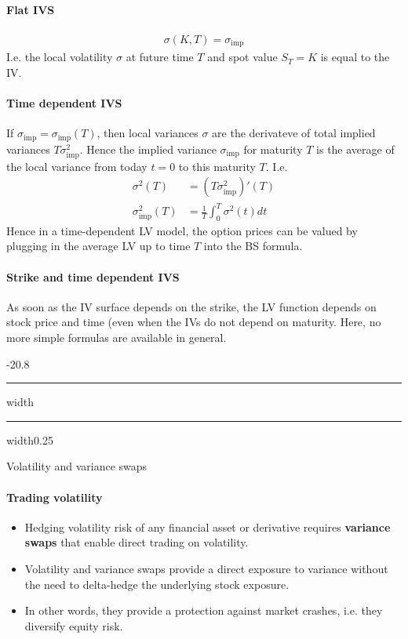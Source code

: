 \documentclass[a4paper,landscape,7pt,fleqn]{scrartcl}
\makeatletter
\renewcommand{\emph}[1]{\textbf{#1}}
\renewcommand{\subsection}{\@startsection{subsection}{1}{0mm}%
{-2\baselineskip}{0.8\baselineskip}%
{\hrule depth 0.2pt width\columnwidth\hrule depth0.75pt
width0.25\columnwidth\vspace*{1.2em}\large\bfseries}}
\makeatother
\begin{document}
\begin{multicols*}{3}
\paragraph{Flat IVS}
\begin{align*}
\sigma(K,T) = \sigma_{\text{imp}}
\end{align*}
I.e. the local volatility $\sigma$ at future time $T$ and spot value $S_T=K$ is equal to the IV.

\paragraph{Time dependent IVS}
If $\sigma_{\text{imp}} = \sigma_{\text{imp}}(T)$, then local variances $\sigma$ are the derivateve of total implied variances $T \sigma_{\text{imp}}^2$. Hence the implied variance $\sigma_{\text{imp}}$ for maturity $T$ is the average of the local variance from today $t=0$ to this maturity $T$. I.e.
\begin{align*}
\sigma^2(T) &= (T \sigma_{\text{imp}}^2)'(T) \\
\sigma_{\text{imp}}^2(T) &= \frac{1}{T} \int_0^T \sigma^2(t) dt
\end{align*}
Hence in a time-dependent LV model, the option prices can be valued by plugging in the average LV up to time $T$ into the BS formula.

\paragraph{Strike and time dependent IVS}
As soon as the IV surface depends on the strike, the LV function depends on stock price and time (even when the IVs do not depend on maturity. Here, no more simple formulas are available in general.

\subsection{Volatility and variance swaps}

\paragraph{Trading volatility}
\begin{itemize}
\item Hedging volatility risk of any financial asset or derivative requires \emph{variance swaps} that enable direct trading on volatility.
\item Volatility and variance swaps provide a direct exposure to variance without the need to delta-hedge the underlying stock exposure.
\item In other words, they provide a protection against market crashes, i.e. they diversify equity risk.
\end{itemize}


\end{multicols*}
\end{document}

